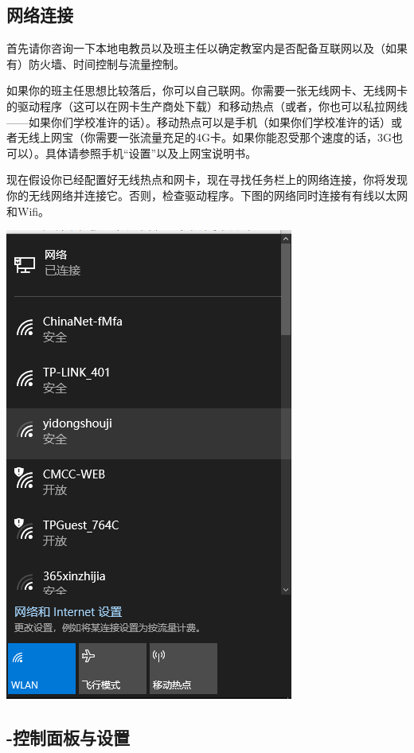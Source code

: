 \subsection{网络连接}
首先请你咨询一下本地电教员以及班主任以确定教室内是否配备互联网以及（如果有）防火墙、时间控制与流量控制。\par
如果你的班主任思想比较落后，你可以自己联网。你需要一张无线网卡、无线网卡的驱动程序（这可以在网卡生产商处下载）和移动热点（或者，你也可以私拉网线——如果你们学校准许的话）。移动热点可以是手机（如果你们学校准许的话）或者无线上网宝（你需要一张流量充足的4G卡。如果你能忍受那个速度的话，3G也可以）。具体请参照手机“设置”以及上网宝说明书。\par
现在假设你已经配置好无线热点和网卡，现在寻找任务栏上的网络连接，你将发现你的无线网络并连接它。否则，检查驱动程序。下图的网络同时连接有有线以太网和Wifi。
\begin{center}
	\includegraphics[scale=0.8]{pic/wifi}
\end{center} 
\subsection{-控制面板与设置}
